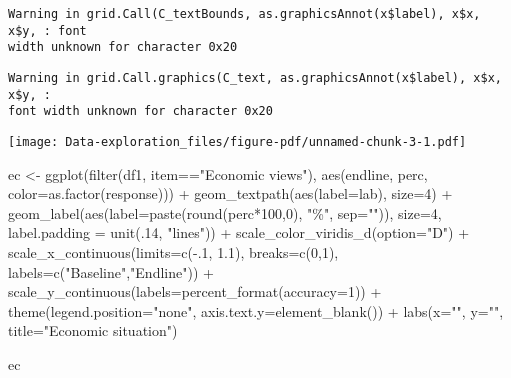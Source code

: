 \documentclass[
  letterpaper,
  DIV=11,
  numbers=noendperiod]{scrreprt}
\newenvironment{Shaded}{\begin{snugshade}}{\end{snugshade}}
\newcommand{\AttributeTok}[1]{\textcolor[rgb]{0.40,0.45,0.13}{#1}}
\newcommand{\DecValTok}[1]{\textcolor[rgb]{0.68,0.00,0.00}{#1}}
\newcommand{\FloatTok}[1]{\textcolor[rgb]{0.68,0.00,0.00}{#1}}
\newcommand{\FunctionTok}[1]{\textcolor[rgb]{0.28,0.35,0.67}{#1}}
\newcommand{\NormalTok}[1]{\textcolor[rgb]{0.00,0.23,0.31}{#1}}
\newcommand{\OtherTok}[1]{\textcolor[rgb]{0.00,0.23,0.31}{#1}}
\newcommand{\SpecialCharTok}[1]{\textcolor[rgb]{0.37,0.37,0.37}{#1}}
\newcommand{\StringTok}[1]{\textcolor[rgb]{0.13,0.47,0.30}{#1}}
\begin{document}
\begin{verbatim}
Warning in grid.Call(C_textBounds, as.graphicsAnnot(x$label), x$x, x$y, : font
width unknown for character 0x20
\end{verbatim}

\begin{verbatim}
Warning in grid.Call.graphics(C_text, as.graphicsAnnot(x$label), x$x, x$y, :
font width unknown for character 0x20
\end{verbatim}

\texttt{[image: Data-exploration\_files/figure-pdf/unnamed-chunk-3-1.pdf]}

\begin{Shaded}
\begin{Highlighting}[]
\NormalTok{ec }\OtherTok{\textless{}{-}} \FunctionTok{ggplot}\NormalTok{(}\FunctionTok{filter}\NormalTok{(df1, item}\SpecialCharTok{==}\StringTok{"Economic views"}\NormalTok{), }\FunctionTok{aes}\NormalTok{(endline, perc, }\AttributeTok{color=}\FunctionTok{as.factor}\NormalTok{(response))) }\SpecialCharTok{+} 
  \FunctionTok{geom\_textpath}\NormalTok{(}\FunctionTok{aes}\NormalTok{(}\AttributeTok{label=}\NormalTok{lab),}
                \AttributeTok{size=}\DecValTok{4}\NormalTok{) }\SpecialCharTok{+}
  \FunctionTok{geom\_label}\NormalTok{(}\FunctionTok{aes}\NormalTok{(}\AttributeTok{label=}\FunctionTok{paste}\NormalTok{(}\FunctionTok{round}\NormalTok{(perc}\SpecialCharTok{*}\DecValTok{100}\NormalTok{,}\DecValTok{0}\NormalTok{), }\StringTok{"\%"}\NormalTok{, }\AttributeTok{sep=}\StringTok{""}\NormalTok{)),}
             \AttributeTok{size=}\DecValTok{4}\NormalTok{,}
             \AttributeTok{label.padding =} \FunctionTok{unit}\NormalTok{(.}\DecValTok{14}\NormalTok{, }\StringTok{"lines"}\NormalTok{)) }\SpecialCharTok{+}
  \FunctionTok{scale\_color\_viridis\_d}\NormalTok{(}\AttributeTok{option=}\StringTok{"D"}\NormalTok{) }\SpecialCharTok{+}
  \FunctionTok{scale\_x\_continuous}\NormalTok{(}\AttributeTok{limits=}\FunctionTok{c}\NormalTok{(}\SpecialCharTok{{-}}\NormalTok{.}\DecValTok{1}\NormalTok{, }\FloatTok{1.1}\NormalTok{),}
                     \AttributeTok{breaks=}\FunctionTok{c}\NormalTok{(}\DecValTok{0}\NormalTok{,}\DecValTok{1}\NormalTok{),}
                     \AttributeTok{labels=}\FunctionTok{c}\NormalTok{(}\StringTok{"Baseline"}\NormalTok{,}\StringTok{"Endline"}\NormalTok{)) }\SpecialCharTok{+}
  \FunctionTok{scale\_y\_continuous}\NormalTok{(}\AttributeTok{labels=}\FunctionTok{percent\_format}\NormalTok{(}\AttributeTok{accuracy=}\DecValTok{1}\NormalTok{)) }\SpecialCharTok{+}
  \FunctionTok{theme}\NormalTok{(}\AttributeTok{legend.position=}\StringTok{"none"}\NormalTok{,}
        \AttributeTok{axis.text.y=}\FunctionTok{element\_blank}\NormalTok{()) }\SpecialCharTok{+}
  \FunctionTok{labs}\NormalTok{(}\AttributeTok{x=}\StringTok{""}\NormalTok{,}
       \AttributeTok{y=}\StringTok{""}\NormalTok{,}
       \AttributeTok{title=}\StringTok{"Economic situation"}\NormalTok{) }

\NormalTok{ec}
\end{Highlighting}
\end{Shaded}
\end{document}
